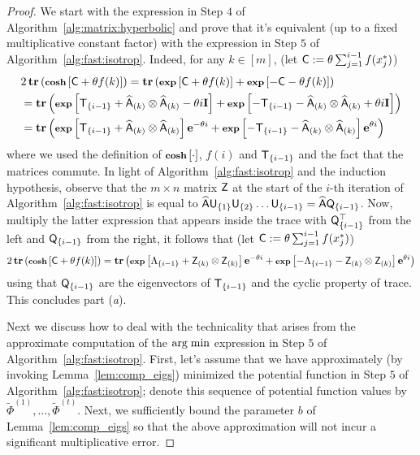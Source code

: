 \begin{proof}
%
We start with the expression in Step $4$ of Algorithm~\ref{alg:matrix:hyperbolic} and prove that it's equivalent (up to a fixed multiplicative constant factor) with the expression in Step $5$ of Algorithm~\ref{alg:fast:isotrop}. Indeed, for any $k\in{[m]}$, (let ${\mathsf{C} } := \theta\sum_{j=1}^{i-1} f(x_j^*)$)
\begin{align*}
&2\operatorname{\textbf{tr}}\left(\operatorname{\textbf{\footnotesize cosh}}\left[ {\mathsf{C} } + \theta f(k) \right]\right)  =  \operatorname{\textbf{tr}}\left(\operatorname{\textbf{\footnotesize exp}}\left[ {\mathsf{C} }  + \theta f(k) \right] + \operatorname{\textbf{\footnotesize exp}}\left[-{\mathsf{C} } - \theta f(k) \right]\right)  \\
																  & = \operatorname{\textbf{tr}}\left(\operatorname{\textbf{\footnotesize exp}}\left[ {\mathsf{T} }_{\{i-1\}} + \widehat{{\mathsf{A} }}_{(k)}\otimes \widehat{{\mathsf{A} }}_{(k)} - \theta i \mathbf{I} \right] + \operatorname{\textbf{\footnotesize exp}}\left[- {\mathsf{T} }_{\{i-1\}} - \widehat{{\mathsf{A} }}_{(k)}\otimes \widehat{{\mathsf{A} }}_{(k)} + \theta i \mathbf{I}\right]\right)  \\
																   &= \operatorname{\textbf{tr}}\left(\operatorname{\textbf{\footnotesize exp}}\left[ {\mathsf{T} }_{\{i-1\}} + \widehat{{\mathsf{A} }}_{(k)}\otimes \widehat{{\mathsf{A} }}_{(k)} \right]{\mathbf e}^{- \theta i} + \operatorname{\textbf{\footnotesize exp}}\left[- {\mathsf{T} }_{\{i-1\}} - \widehat{{\mathsf{A} }}_{(k)}\otimes \widehat{{\mathsf{A} }}_{(k)} \right]{\mathbf e}^{ \theta i}\right)
\end{align*}
where we used the definition of $\operatorname{\textbf{\footnotesize cosh}}\left[\cdot\right]$, $f(i)$ and ${\mathsf{T} }_{\{i-1\}}$ and the fact that the matrices commute. In light of Algorithm~\ref{alg:fast:isotrop} and the induction hypothesis, observe that the $m\times n$ matrix ${\mathsf{Z} }$ at the start of the $i$-th iteration of Algorithm~\ref{alg:fast:isotrop} is equal to $\widehat{{\mathsf{A} }} {\mathsf{U} }_{\{1\}} {\mathsf{U} }_{\{2\}} \ldots {\ensuremath{\mathsf{U} }}_{\{i -1 \}}=  \widehat{{\mathsf{A} }} {\mathsf{Q} }_{\{i - 1\}}$. Now, multiply the latter expression that appears inside the trace with ${\mathsf{Q} }_{\{i-1\}}^\top $ from the left and ${\mathsf{Q} }_{\{i-1\}}$ from the right, it follows that (let ${\mathsf{C} } := \theta\sum_{j=1}^{i-1} f(x_j^*)$)
\begin{align*}
	2\operatorname{\textbf{tr}}\left(\operatorname{\textbf{\footnotesize cosh}}\left[ {\mathsf{C} } + \theta f(k) \right]\right)  =  \operatorname{\textbf{tr}}\left(\operatorname{\textbf{\footnotesize exp}}\left[ \Lambda_{\{i-1\}} + {\mathsf{Z} }_{(k)}\otimes {\ensuremath{\mathsf{Z} }}_{(k)} \right]{\mathbf e}^{- \theta  i} + \operatorname{\textbf{\footnotesize exp}}\left[- \Lambda_{\{i-1\}} - {\mathsf{Z} }_{(k)}\otimes {\ensuremath{\mathsf{Z} }}_{(k)} \right]{\mathbf e}^{ \theta i}\right)
\end{align*}
using that ${\mathsf{Q} }_{\{i-1\}}$ are the eigenvectors of ${\mathsf{T} }_{\{i - 1\}}$ and the cyclic property of trace. This concludes part (\emph{a}).
%

%
Next we discuss how to deal with the technicality that arises from the approximate computation of the $\operatorname*{arg\; min}$ expression in Step $5$ of Algorithm~\ref{alg:fast:isotrop}. First, let's assume that we have approximately (by invoking Lemma~\ref{lem:comp_eigs}) minimized the potential function in Step $5$ of Algorithm~\ref{alg:fast:isotrop}; denote this sequence of potential function values by  $\widetilde{\Phi}^{(1)},\ldots , \widetilde{\Phi}^{(t)}$. Next, we sufficiently bound the parameter $b$ of Lemma~\ref{lem:comp_eigs} so that the above approximation will not incur a significant multiplicative error.
%


\end{proof}
